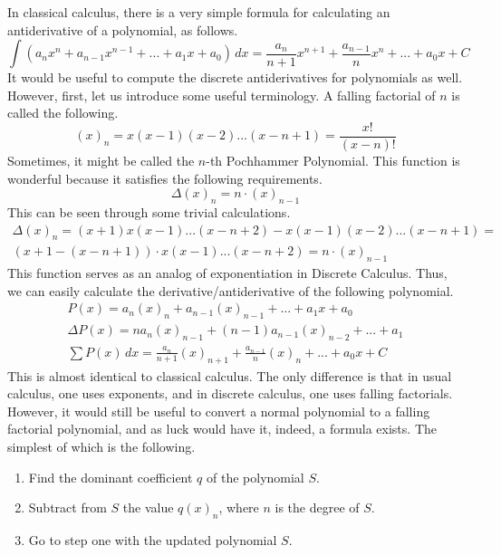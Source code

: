 \documentclass{article}
\begin{document}
In classical calculus, there is a very simple formula for calculating an antiderivative of a polynomial, as follows.
\begin{equation}
	\int (a_n x^n + a_{n - 1} x^{n - 1} + ... + a_1 x + a_0) \,dx = \frac{a_n}{n + 1} x^{n + 1} + \frac{a_{n - 1}}{n} x^{n} + ... + a_0 x + C
\end{equation}
It would be useful to compute the discrete antiderivatives for polynomials as well. However, first, let us introduce some useful terminology. A falling factorial of \(n\) is called the following.
\begin{equation}
	(x)_n = x(x - 1)(x - 2)...(x - n + 1) = \frac{x!}{(x - n)!}
\end{equation}
Sometimes, it might be called the \(n\)-th Pochhammer Polynomial. This function is wonderful because it satisfies the following requirements.
\begin{equation}
	\Delta (x)_n = n \cdot (x)_{n - 1}
\end{equation}
This can be seen through some trivial calculations.
\begin{multline}
	\Delta (x)_n = (x + 1)x(x - 1)...(x - n + 2) - x(x - 1)(x - 2)...(x - n + 1) = \\
	 (x + 1 - (x - n + 1)) \cdot x(x - 1)...(x - n + 2) = n \cdot (x)_{n - 1} \nonumber
\end{multline}
This function serves as an analog of exponentiation in Discrete Calculus. Thus, we can easily calculate the derivative/antiderivative of the following polynomial.
\begin{gather}
	\label{eq:FPP} P(x) = a_n (x)_n + a_{n - 1} (x)_{n - 1} + ... + a_1 x + a_0 \\
	\Delta P(x) = n a_n (x)_{n - 1} + (n - 1) a_{n - 1} (x)_{n - 2} + ... + a_1 \\
	\sum P(x) \,dx = \frac{a_n}{n + 1} (x)_{n + 1} + \frac{a_{n - 1}}{n} (x)_{n} + ... + a_0 x + C
\end{gather}
This is almost identical to classical calculus. The only difference is that in usual calculus, one uses exponents, and in discrete calculus, one uses falling factorials. However, it would still be useful to convert a normal polynomial to a falling factorial polynomial, and as luck would have it, indeed, a formula exists. The simplest of which is the following.
\begin{enumerate}
	\item Find the dominant coefficient \(q\) of the polynomial \(S\).
	\item Subtract from \(S\) the value \(q (x)_n\), where \(n\) is the degree of \(S\).
	\item Go to step one with the updated polynomial \(S\).
\end{enumerate}
\end{document}
